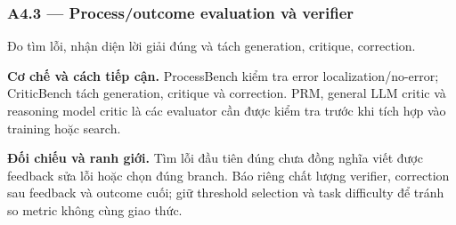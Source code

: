 \subsubsection*{A4.3 — Process/outcome evaluation và verifier}
Đo tìm lỗi, nhận diện lời giải đúng và tách generation, critique, correction.

\noindent\textbf{Cơ chế và cách tiếp cận.} ProcessBench kiểm tra error localization/no-error; CriticBench tách generation, critique và correction. PRM, general LLM critic và reasoning model critic là các evaluator cần được kiểm tra trước khi tích hợp vào training hoặc search.\par
\noindent\textbf{Đối chiếu và ranh giới.} Tìm lỗi đầu tiên đúng chưa đồng nghĩa viết được feedback sửa lỗi hoặc chọn đúng branch. Báo riêng chất lượng verifier, correction sau feedback và outcome cuối; giữ threshold selection và task difficulty để tránh so metric không cùng giao thức.\par

